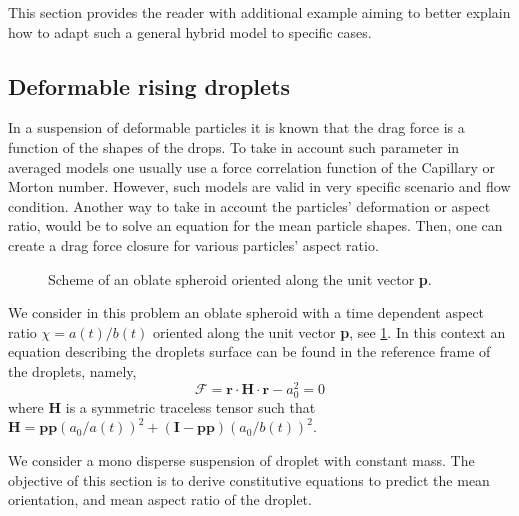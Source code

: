 This section provides the reader with additional example aiming to better explain how to adapt such a general hybrid model to specific cases. 

\subsection{Deformable rising droplets}

In a suspension of deformable particles it is known that the drag force is a function of the shapes of the drops.
To take in account such parameter in averaged models one usually use a force correlation function of the Capillary or Morton number. 
However, such models are valid in very specific scenario and flow condition. 
Another way to take in account the particles' deformation or aspect ratio, would be to solve an equation for the mean particle shapes. 
Then, one can create a drag force closure for various particles' aspect ratio. 

\begin{figure}[h!]
    \centering
    \hfill
    \hfill
    \caption{Scheme of an  oblate spheroid oriented along the unit vector \textbf{p}.}
    \label{fig:scheme2}
\end{figure}
We consider in this problem an oblate spheroid with a time dependent aspect ratio $\chi = a(t)/b(t)$ oriented along the unit vector \textbf{p}, see \ref{fig:scheme2}.
In this context an equation describing the droplets surface can be found in the reference frame of the droplets, namely, 
\begin{equation}
    \mathscr{F}
    = \textbf{r}\cdot \textbf{H}\cdot \textbf{r} - a_0^2 = 0 
    \label{eq:F_def}
\end{equation}
where \textbf{H} is a symmetric traceless tensor such that $\textbf{H} = \textbf{pp} (a_0/a(t))^2 + (\textbf{I}- \textbf{pp})(a_0/b(t))^2$. 

We consider a mono disperse suspension of droplet with constant mass. 
The objective of this section is to derive constitutive equations to predict the mean orientation, and mean aspect ratio of the droplet. 

